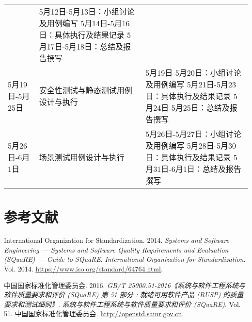 \documentclass[hyperref, a4paper]{ctexart}
\begin{document}
\begin{longtable}[]{@{}lll@{}}
\begin{minipage}[t]{0.28\columnwidth}
\end{minipage} & \begin{minipage}[t]{0.50\columnwidth}\raggedright
5月12日-5月13日：小组讨论及用例编写 5月14日-5月16日：具体执行及结果记录
5月17日-5月18日：总结及报告撰写\strut
\end{minipage}\tabularnewline
\begin{minipage}[t]{0.13\columnwidth}\raggedright
5月19日-5月25日\strut
\end{minipage} & \begin{minipage}[t]{0.28\columnwidth}\raggedright
安全性测试与静态测试用例设计与执行\strut
\end{minipage} & \begin{minipage}[t]{0.50\columnwidth}\raggedright
5月19日-5月20日：小组讨论及用例编写 5月21日-5月23日：具体执行及结果记录
5月24日-5月25日：总结及报告撰写\strut
\end{minipage}\tabularnewline
\begin{minipage}[t]{0.13\columnwidth}\raggedright
5月26日-6月1日\strut
\end{minipage} & \begin{minipage}[t]{0.28\columnwidth}\raggedright
场景测试用例设计与执行\strut
\end{minipage} & \begin{minipage}[t]{0.50\columnwidth}\raggedright
5月26日-5月27日：小组讨论及用例编写 5月28日-5月30日：具体执行及结果记录
5月31日-6月1日：总结及报告撰写\strut
\end{minipage}\tabularnewline
\bottomrule
\end{longtable}

\pagebreak

\hypertarget{ux53c2ux8003ux6587ux732e}{%
\section*{参考文献}\label{ux53c2ux8003ux6587ux732e}}

\hypertarget{refs}{}
\leavevmode\hypertarget{ref-innovativeInternationalisation}{}%
International Organization for Standardization. 2014. \emph{Systems and
Software Engineering --- Systems and Software Quality Requirements and
Evaluation (SQuaRE) --- Guide to SQuaRE}. \emph{International
Organization for Standardization}. Vol. 2014.
\url{https://www.iso.org/standard/64764.html}.

\leavevmode\hypertarget{ref-innovative1}{}%
中国国家标准化管理委员会. 2016. \emph{GB/T
25000.51-2016《系统与软件工程系统与软件质量要求和评价 (SQuaRE) 第 51
部分 : 就绪可用软件产品 (RUSP) 的质量要求和测试细则》}.
\emph{系统与软件工程系统与软件质量要求和评价 (SQuaRE)}. Vol. 51.
中国国家标准化管理委员会. \url{http://openstd.samr.gov.cn}.
\end{document}
